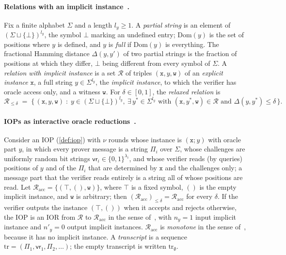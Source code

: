 \paragraph{Relations with an implicit instance~\cite[\S3.3]{CDHZ25}.}
Fix a finite alphabet $\Sigma$ and a length $l_y \ge 1$.
A \emph{partial string} is an element of $(\Sigma \sqcup \{\bot\})^{l_y}$, the symbol $\bot$ marking an undefined entry; $\mathrm{Dom}(y)$ is the set of positions where $y$ is defined, and $y$ is \emph{full} if $\mathrm{Dom}(y)$ is everything.
The fractional Hamming distance $\Delta(y,y')$ of two partial strings is the fraction of positions at which they differ, $\bot$ being different from every symbol of $\Sigma$.
A \emph{relation with implicit instance} is a set $\mathcal{R}$ of triples $(\mathtt{x}, y, \mathtt{w})$ of an \emph{explicit instance} $\mathtt{x}$, a full string $y \in \Sigma^{l_y}$, the \emph{implicit instance}, to which the verifier has oracle access only, and a witness $\mathtt{w}$.
For $\delta \in [0,1]$, the \emph{relaxed relation} is
\[
  \mathcal{R}_{\le\delta} \;=\; \bigl\{\, (\mathtt{x}, y, \mathtt{w}) \;:\; y \in (\Sigma \sqcup \{\bot\})^{l_y},\ \exists\, y^* \in \Sigma^{l_y} \text{ with } (\mathtt{x}, y^*, \mathtt{w}) \in \mathcal{R} \text{ and } \Delta(y, y^*) \le \delta \,\bigr\}.
\]

\paragraph{IOPs as interactive oracle reductions~\cite[\S3.4]{CDHZ25}.}
Consider an IOP (\cref{def:iop}) with $\nu$ rounds whose instance is $(\mathtt{x}; y)$ with oracle part $y$, in which every prover message is a string $\Pi_i$ over $\Sigma$, whose challenges are uniformly random bit strings $\mathsf{vr}_i \in \{0,1\}^{\lambda_i}$, and whose verifier reads (by queries) positions of $y$ and of the $\Pi_i$ that are determined by $\mathtt{x}$ and the challenges only; a message part that the verifier reads entirely is a string all of whose positions are read.
Let $\mathcal{R}_{\mathrm{acc}} = \{(\top, (), \mathtt{w})\}$, where $\top$ is a fixed symbol, $()$ is the empty implicit instance, and $\mathtt{w}$ is arbitrary; then $(\mathcal{R}_{\mathrm{acc}})_{\le\delta} = \mathcal{R}_{\mathrm{acc}}$ for every $\delta$.
If the verifier outputs the instance $(\top, ())$ when it accepts and rejects otherwise, the IOP is an IOR from $\mathcal{R}$ to $\mathcal{R}_{\mathrm{acc}}$ in the sense of~\cite[\S3.4]{CDHZ25}, with $n_y = 1$ input implicit instance and $n'_y = 0$ output implicit instances.
$\mathcal{R}_{\mathrm{acc}}$ is \emph{monotone} in the sense of~\cite[Definition~11.1]{CDHZ25}, because it has no implicit instance.
A \emph{transcript} is a sequence $\mathrm{tr} = (\Pi_1, \mathsf{vr}_1, \Pi_2, \dots)$; the empty transcript is written $\mathrm{tr}_\emptyset$.

